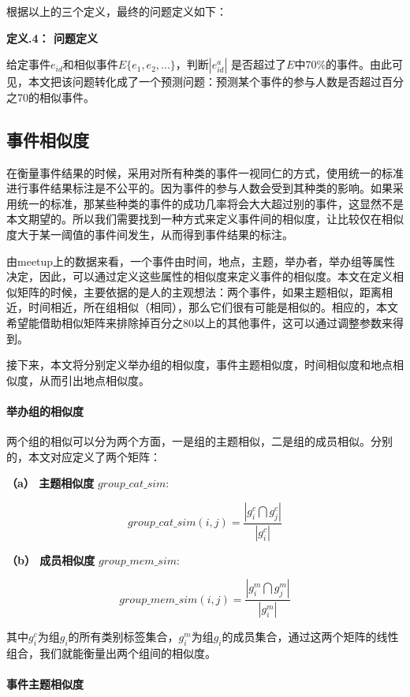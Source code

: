 根据以上的三个定义，最终的问题定义如下：
\newline

\textbf{定义\thesection.4： 问题定义}

给定事件\(e_{id}\)和相似事件\(E\{e_1,e_2,...\}\)，判断\(|e_{id}^a|\)
是否超过了\(E\)中70\%的事件。由此可见，本文把该问题转化成了一个预测问题：预测某个事件的参与人数是否超过百分之70的相似事件。
\subsection{事件相似度}\label{s1-4}
在衡量事件结果的时候，采用对所有种类的事件一视同仁的方式，使用统一的标准进行事件结果标注是不公平的。因为事件的参与人数会受到其种类的影响。如果采用统一的标准，那某些种类的事件的成功几率将会大大超过别的事件，这显然不是本文期望的。所以我们需要找到一种方式来定义事件间的相似度，让比较仅在相似度大于某一阈值的事件间发生，从而得到事件结果的标注。

由meetup上的数据来看，一个事件由时间，地点，主题，举办者，举办组等属性决定，因此，可以通过定义这些属性的相似度来定义事件的相似度。本文在定义相似矩阵的时候，主要依据的是人的主观想法：两个事件，如果主题相似，距离相近，时间相近，所在组相似（相同），那么它们很有可能是相似的。相应的，本文希望能借助相似矩阵来排除掉百分之80以上的其他事件，这可以通过调整参数来得到。

接下来，本文将分别定义举办组的相似度，事件主题相似度，时间相似度和地点相似度，从而引出地点相似度。
\paragraph{举办组的相似度}
两个组的相似可以分为两个方面，一是组的主题相似，二是组的成员相似。分别的，本文对应定义了两个矩阵：

\textbf{（a） 主题相似度} \(group\_cat\_sim:\)

\begin{equation}
group\_cat\_sim(i,j)=\frac{|g_i^c\bigcap g_j^c|}{|g_i^c|}
\end{equation}


\textbf{（b） 成员相似度} \(group\_mem\_sim:\)

\begin{equation}
group\_mem\_sim(i,j)=\frac{|g_i^m\bigcap g_j^m|}{|g_i^m|}
\end{equation}

其中$g_i^c$为组$g_i$的所有类别标签集合，$g_i^m$为组$g_i$的成员集合，通过这两个矩阵的线性组合，我们就能衡量出两个组间的相似度。

\paragraph{事件主题相似度}

